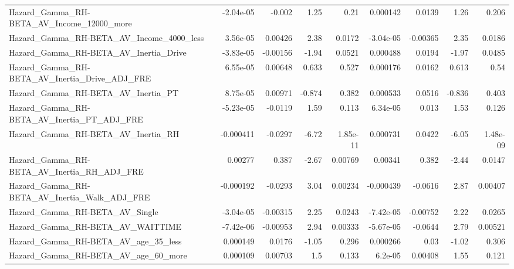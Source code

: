 \begin{tabular}{lrrrrrrrr}
Hazard\_Gamma\_RH-BETA\_AV\_Income\_12000\_more          &   -2.04e-05 &       -0.002 &     1.25 &     0.21 &   0.000142 &      0.0139 &         1.26 &         0.206 \\
Hazard\_Gamma\_RH-BETA\_AV\_Income\_4000\_less           &    3.56e-05 &      0.00426 &     2.38 &   0.0172 &  -3.04e-05 &    -0.00365 &         2.35 &        0.0186 \\
Hazard\_Gamma\_RH-BETA\_AV\_Inertia\_Drive              &   -3.83e-05 &     -0.00156 &    -1.94 &   0.0521 &   0.000488 &      0.0194 &        -1.97 &        0.0485 \\
Hazard\_Gamma\_RH-BETA\_AV\_Inertia\_Drive\_ADJ\_FRE      &    6.55e-05 &      0.00648 &    0.633 &    0.527 &   0.000176 &      0.0162 &        0.613 &          0.54 \\
Hazard\_Gamma\_RH-BETA\_AV\_Inertia\_PT                 &    8.75e-05 &      0.00971 &   -0.874 &    0.382 &   0.000533 &      0.0516 &       -0.836 &         0.403 \\
Hazard\_Gamma\_RH-BETA\_AV\_Inertia\_PT\_ADJ\_FRE         &   -5.23e-05 &      -0.0119 &     1.59 &    0.113 &   6.34e-05 &       0.013 &         1.53 &         0.126 \\
Hazard\_Gamma\_RH-BETA\_AV\_Inertia\_RH                 &   -0.000411 &      -0.0297 &    -6.72 & 1.85e-11 &   0.000731 &      0.0422 &        -6.05 &      1.48e-09 \\
Hazard\_Gamma\_RH-BETA\_AV\_Inertia\_RH\_ADJ\_FRE         &     0.00277 &        0.387 &    -2.67 &  0.00769 &    0.00341 &       0.382 &        -2.44 &        0.0147 \\
Hazard\_Gamma\_RH-BETA\_AV\_Inertia\_Walk\_ADJ\_FRE       &   -0.000192 &      -0.0293 &     3.04 &  0.00234 &  -0.000439 &     -0.0616 &         2.87 &       0.00407 \\
Hazard\_Gamma\_RH-BETA\_AV\_Single                     &   -3.04e-05 &     -0.00315 &     2.25 &   0.0243 &  -7.42e-05 &    -0.00752 &         2.22 &        0.0265 \\
Hazard\_Gamma\_RH-BETA\_AV\_WAITTIME                   &   -7.42e-06 &     -0.00953 &     2.94 &  0.00333 &  -5.67e-05 &     -0.0644 &         2.79 &       0.00521 \\
Hazard\_Gamma\_RH-BETA\_AV\_age\_35\_less                &    0.000149 &       0.0176 &    -1.05 &    0.296 &   0.000266 &        0.03 &        -1.02 &         0.306 \\
Hazard\_Gamma\_RH-BETA\_AV\_age\_60\_more                &    0.000109 &      0.00703 &      1.5 &    0.133 &    6.2e-05 &     0.00408 &         1.55 &         0.121 \\

\end{tabular}
